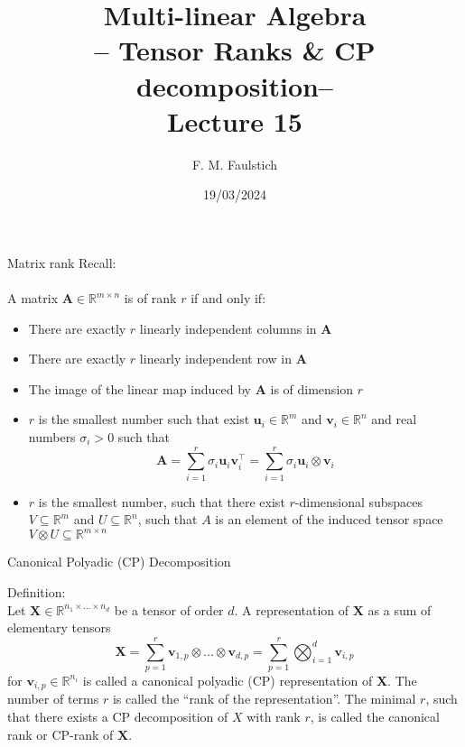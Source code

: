 \documentclass{beamer}
\title{
Multi-linear Algebra\\
-- Tensor Ranks \& CP decomposition--\\
Lecture 15
}
\author{F. M. Faulstich}
\date{19/03/2024}
\newcommand{\bvec}[1]{\mathbf{#1}}
\newcommand{\vu}{\bvec{u}}
\newcommand{\vv}{\bvec{v}}
\newcommand{\vA}{\bvec{A}}
\newcommand{\vX}{\bvec{X}}
\newcommand{\bitem}{\item[$\bullet$]}
\begin{document}
\frame{\titlepage}


\begin{frame}{Matrix rank}
Recall:\\
~\\
A matrix $\vA \in \mathbb{R}^{m\times n}$ is of rank $r$ if and only if:
\begin{itemize}
    \bitem There are exactly $r$ linearly independent columns in $\vA$
    \bitem There are exactly $r$ linearly independent row in $\vA$
    \bitem The image of the linear map induced by $\vA$ is of dimension $r$ 
    \bitem $r$ is the smallest number such that exist $\vu_i \in \mathbb{R}^m$ and $\vv_i \in \mathbb{R}^n$ and real numbers $\sigma_i>0$ such that 
    $$
    \vA 
    = 
    \sum_{i=1}^r \sigma_i \vu_i \vv_i^{\top}
    =
    \sum_{i=1}^r \sigma_i \vu_i  \otimes \vv_i
    $$
    \bitem $r$ is the smallest number, such that there exist $r$-dimensional subspaces $V \subseteq \mathbb{R}^m$ and $U \subseteq \mathbb{R}^n$, such that $A$ is an element of the induced tensor space $V \otimes U \subseteq \mathbb{R}^{m\times n}$
\end{itemize}
\end{frame}


\begin{frame}{Canonical Polyadic (CP) Decomposition}

Definition:\\
Let $\vX \in \mathbb{R}^{n_1 \times ... \times n_d}$ be a tensor of order $d$. A representation of $\vX$ as a sum of elementary tensors
$$
\vX
=
\sum_{p=1}^r
\vv_{1,p} \otimes ... \otimes \vv_{d,p}
=
\sum_{p=1}^r \bigotimes_{i=1}^d \vv_{i,p}
$$
for $\vv_{i,p} \in \mathbb{R}^{n_i}$ is called a canonical polyadic (CP) representation of $\vX$. The number of terms $r$ is called the ``rank of the representation''. The minimal $r$, such that there exists a CP decomposition of $X$ with rank $r$, is called the canonical rank or CP-rank of $\vX$.

    
\end{frame}
\end{document}
